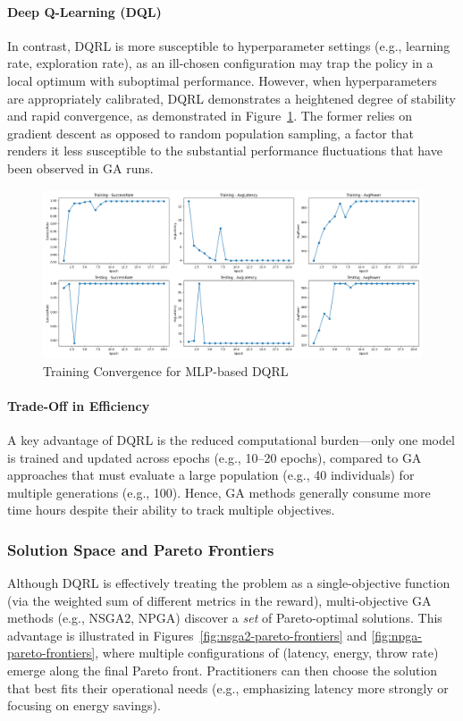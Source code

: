 \documentclass[preprint,12pt]{elsarticle}
\begin{document}
\paragraph{Deep Q-Learning (DQL)}
In contrast, DQRL is more susceptible to hyperparameter settings (e.g., learning rate, exploration rate), as an ill-chosen configuration may trap the policy in a local optimum with suboptimal performance. However, when hyperparameters are appropriately calibrated, DQRL demonstrates a heightened degree of stability and rapid convergence, as demonstrated in Figure~\ref{fig:dqrl-mlp-training-epoch}. The former relies on gradient descent as opposed to random population sampling, a factor that renders it less susceptible to the substantial performance fluctuations that have been observed in GA runs.


\begin{figure}[H]
    \centering
    \includegraphics[width=1\linewidth]{figs/dqrl_mlp_training_epoch.png}
    \caption{Training Convergence for MLP-based DQRL}
    \label{fig:dqrl-mlp-training-epoch}
\end{figure}



\paragraph{Trade-Off in Efficiency}
A key advantage of DQRL is the reduced computational burden—only one model is trained and updated across epochs (e.g., 10–20 epochs), compared to GA approaches that must evaluate a large population (e.g., 40 individuals) for multiple generations (e.g., 100). Hence, GA methods generally consume more time hours despite their ability to track multiple objectives.

\subsubsection{Solution Space and Pareto Frontiers}
Although DQRL is effectively treating the problem as a single-objective function (via the weighted sum of different metrics in the reward), multi-objective GA methods (e.g., NSGA2, NPGA) discover a \emph{set} of Pareto-optimal solutions. This advantage is illustrated in Figures~\ref{fig:nsga2-pareto-frontiers} and \ref{fig:npga-pareto-frontiers}, where multiple configurations of (latency, energy, throw rate) emerge along the final Pareto front. Practitioners can then choose the solution that best fits their operational needs (e.g., emphasizing latency more strongly or focusing on energy savings).
\end{document}
